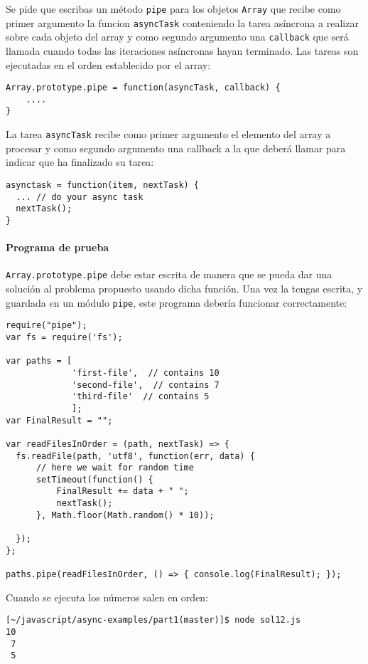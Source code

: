 Se pide que escribas un método \texttt{pipe} para los objetos
\verb|Array| que recibe como primer argumento la funcion \verb|asyncTask| 
conteniendo la tarea asíncrona a realizar
sobre cada objeto del array y como segundo argumento una \verb|callback| que
será llamada cuando todas las iteraciones asíncronas hayan terminado. 
Las tareas son ejecutadas en el orden establecido por el array:

\begin{verbatim}
Array.prototype.pipe = function(asyncTask, callback) {
    ....
}
\end{verbatim}

La tarea \verb|asyncTask| recibe como primer argumento
el elemento del array a procesar y como segundo argumento
una callback a la que deberá llamar 
para indicar que ha finalizado su tarea:
\begin{verbatim}
asynctask = function(item, nextTask) {
  ... // do your async task
  nextTask();
}
\end{verbatim}

\paragraph{Programa de prueba}\label{programa-de-prueba}

\texttt{Array.prototype.pipe} debe estar escrita de manera que
se pueda dar una solución al problema propuesto usando dicha función.
Una vez la tengas escrita, y guardada en un módulo
\texttt{pipe}, este programa debería funcionar correctamente:

\begin{verbatim}
require("pipe");
var fs = require('fs');

var paths = [
             'first-file',  // contains 10
             'second-file',  // contains 7
             'third-file'  // contains 5
             ];
var FinalResult = "";

var readFilesInOrder = (path, nextTask) => {
  fs.readFile(path, 'utf8', function(err, data) {
      // here we wait for random time
      setTimeout(function() {
          FinalResult += data + " ";
          nextTask();
      }, Math.floor(Math.random() * 10));

  });
};

paths.pipe(readFilesInOrder, () => { console.log(FinalResult); });
\end{verbatim}
Cuando se ejecuta los números salen en orden:
\begin{verbatim}
[~/javascript/async-examples/part1(master)]$ node sol12.js 
10
 7
 5
\end{verbatim}


